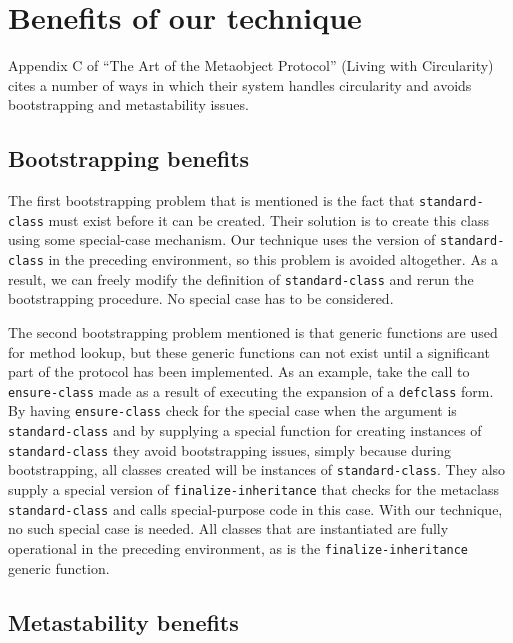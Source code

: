 \section{Benefits of our technique}
\label{sec-benefits}

Appendix C of ``The Art of the Metaobject Protocol''
\cite{Kiczales:1991:AMP:574212} (Living with Circularity) cites a
number of ways in which their system handles circularity and avoids
bootstrapping and metastability issues.

\subsection{Bootstrapping benefits}

The first bootstrapping problem that is mentioned is the fact that
\texttt{standard-class} must exist before it can be created.  Their
solution is to create this class using some special-case mechanism.
Our technique uses the version of \texttt{standard-class} in the
preceding environment, so this problem is avoided altogether.  As a
result, we can freely modify the definition of
\texttt{standard-class} and rerun the bootstrapping procedure.  No
special case has to be considered.

The second bootstrapping problem mentioned is that generic functions
are used for method lookup, but these generic functions can not exist
until a significant part of the protocol has been implemented.  As an
example, take the call to \texttt{ensure-class} made as a result of
executing the expansion of a \texttt{defclass} form.  By having
\texttt{ensure-class} check for the special case when the argument is
\texttt{standard-class} and by supplying a special function for
creating instances of \texttt{standard-class} they avoid bootstrapping
issues, simply because during bootstrapping, all classes created will
be instances of \texttt{standard-class}.  They also supply a special
version of \texttt{finalize-inheritance} that checks for the metaclass
\texttt{standard-class} and calls special-purpose code in this case.
With our technique, no such special case is needed.  All
classes that are instantiated are fully operational in the preceding
environment, as is the \texttt{finalize-inheritance} generic function.

\subsection{Metastability benefits}

